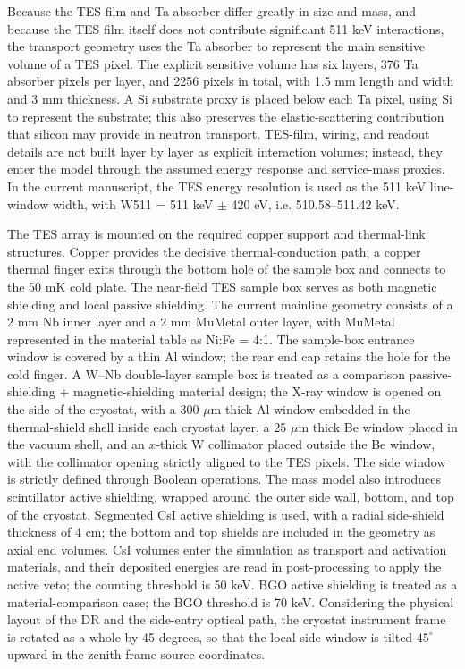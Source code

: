 \documentclass[pdflatex,sn-mathphys-num]{sn-jnl}
\begin{document}
Because the TES film and Ta absorber differ greatly in size and mass, and because the TES film itself does not contribute significant 511 keV interactions, the transport geometry uses the Ta absorber to represent the main sensitive volume of a TES pixel. The explicit sensitive volume has six layers, 376 Ta absorber pixels per layer, and 2256 pixels in total, with 1.5 mm length and width and 3 mm thickness. A Si substrate proxy is placed below each Ta pixel, using Si to represent the substrate; this also preserves the elastic-scattering contribution that silicon may provide in neutron transport. TES-film, wiring, and readout details are not built layer by layer as explicit interaction volumes; instead, they enter the model through the assumed energy response and service-mass proxies. In the current manuscript, the TES energy resolution is used as the 511 keV line-window width, with W511 = 511 keV $\pm$ 420 eV, i.e. 510.58--511.42 keV.

The TES array is mounted on the required copper support and thermal-link structures. Copper provides the decisive thermal-conduction path; a copper thermal finger exits through the bottom hole of the sample box and connects to the 50 mK cold plate. The near-field TES sample box serves as both magnetic shielding and local passive shielding. The current mainline geometry consists of a 2 mm Nb inner layer and a 2 mm MuMetal outer layer, with MuMetal represented in the material table as Ni:Fe = 4:1. The sample-box entrance window is covered by a thin Al window; the rear end cap retains the hole for the cold finger. A W--Nb double-layer sample box is treated as a comparison passive-shielding + magnetic-shielding material design; the X-ray window is opened on the side of the cryostat, with a 300 $\mu$m thick Al window embedded in the thermal-shield shell inside each cryostat layer, a 25 $\mu$m thick Be window placed in the vacuum shell, and an $x$-thick W collimator placed outside the Be window, with the collimator opening strictly aligned to the TES pixels. The side window is strictly defined through Boolean operations. The mass model also introduces scintillator active shielding, wrapped around the outer side wall, bottom, and top of the cryostat. Segmented CsI active shielding is used, with a radial side-shield thickness of 4 cm; the bottom and top shields are included in the geometry as axial end volumes. CsI volumes enter the simulation as transport and activation materials, and their deposited energies are read in post-processing to apply the active veto; the counting threshold is 50 keV. BGO active shielding is treated as a material-comparison case; the BGO threshold is 70 keV. Considering the physical layout of the DR and the side-entry optical path, the cryostat instrument frame is rotated as a whole by 45 degrees, so that the local side window is tilted $45^\circ$ upward in the zenith-frame source coordinates.
\end{document}
